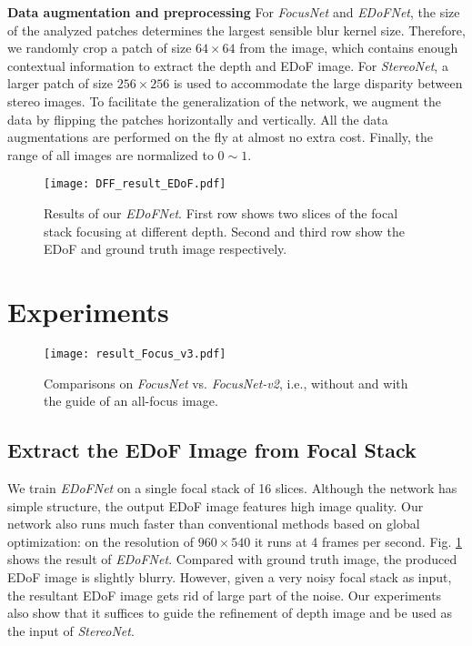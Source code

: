 \documentclass[10pt,twocolumn,letterpaper]{article}
\begin{document}
\noindent\textbf{Data augmentation and preprocessing}
For \emph{FocusNet} and \emph{EDoFNet}, the size of the analyzed patches determines the largest sensible blur kernel size. Therefore, we randomly crop a patch of size $64\times64$ from the image, which contains enough contextual information to extract the depth and EDoF image. For \emph{StereoNet}, a larger patch of size $256\times256$ is used to accommodate the large disparity between stereo images. To facilitate the generalization of the network, we augment the data by flipping the patches horizontally and vertically. All the data augmentations are performed on the fly at almost no extra cost. Finally, the range of all images are normalized to $0\sim1$.

\begin{figure}[t]
\begin{center}
   \texttt{[image: DFF\_result\_EDoF.pdf]}
\end{center}
\vspace{-8pt}
   \caption{Results of our \emph{EDoFNet}. First row shows two slices of the focal stack focusing at different depth. Second and third row show the EDoF and ground truth image respectively.}
\label{fig:result_EDoF}
\end{figure}
\section{Experiments}
\label{section:experiments}

\begin{figure*}[h]
\begin{center}
   \texttt{[image: result\_Focus\_v3.pdf]}
\end{center}
\vspace{-8pt}
   \caption{Comparisons on \emph{FocusNet} vs. \emph{FocusNet-v2}, i.e., without and with the guide of an all-focus image.}
\label{fig:result_DfF}
\end{figure*}

\subsection{Extract the EDoF Image from Focal Stack}
We train \emph{EDoFNet} on a single focal stack of 16 slices. Although the network has simple structure, the output EDoF image features high image quality. Our network also runs much faster than conventional methods based on global optimization: on the resolution of $960\times540$ it runs at 4 frames per second. Fig. \ref{fig:result_EDoF} shows the result of \emph{EDoFNet}. Compared with ground truth image, the produced EDoF image is slightly blurry. However, given a very noisy focal stack as input, the resultant EDoF image gets rid of large part of the noise. Our experiments also show that it suffices to guide the refinement of depth image and be used as the input of \emph{StereoNet}.
\end{document}
